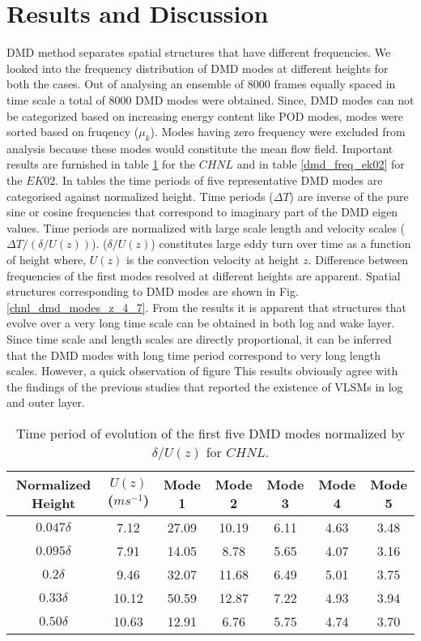 \documentclass{article}
\begin{document}
\section{Results and Discussion}
DMD method separates spatial structures that have different frequencies. We looked into the frequency distribution of DMD modes at different heights for both the cases. Out of analysing an ensemble of 8000 frames equally spaced in time scale a total of 8000 DMD modes were obtained. Since, DMD modes can not be categorized based on increasing energy content like POD modes, modes were sorted based on fruqency ($\mu_k$). Modes having zero frequency were excluded from analysis because these modes would constitute the mean flow field. Important results are furnished in table \ref{dmd_freq_chnl} for the $CHNL$ and in table \ref{dmd_freq_ek02} for the $EK02$. In tables the time periods of five representative DMD modes are categorised against normalized height. Time periods ($\Delta T$) are inverse of the pure sine or cosine frequencies that correspond to imaginary part of the DMD eigen values. Time periods are normalized with large scale length and velocity scales ($\Delta T / (\delta/U(z))$). ($\delta/U(z)$) constitutes large eddy turn over time as a function of height where, $U(z)$ is the convection velocity at height $z$. Difference between frequencies of the first modes resolved at different heights are apparent. Spatial structures corresponding to DMD modes are shown in Fig. \ref{chnl_dmd_modes_z_4_7}. From the results it is apparent that structures that evolve over a very long time scale can be obtained in both log and wake layer. Since time scale and length scales are directly proportional, it can be inferred that the DMD modes with long time period correspond to very long length scales. However, a quick observation of figure This results obviously agree with the findings of the previous studies that reported the existence of VLSMs in log and outer layer. 
\begin{table}[!bth]
\caption{Time period of evolution of the first five DMD modes normalized by $\delta / U(z)$ for $CHNL$. }
\begin{center}
\begin{tabular}{  c  c c c c c c  } 
\hline
Normalized Height & $U(z)$($ms^{-1}$) & Mode 1 & Mode 2 & Mode 3 & Mode 4 & Mode 5   \\
\hline
\multirow{1}{4em}{$0.047\delta$} & 7.12   & 27.09 & 10.19 & 6.11 & 4.63 & 3.48   \\
\hline
\multirow{1}{4em}{$0.095\delta$} &  7.91  & 14.05 & 8.78 & 5.65 & 4.07 & 3.16  \\
\hline
\multirow{1}{4em}{$0.2\delta$}   &  9.46  & 32.07 & 11.68 & 6.49 & 5.01 & 3.75  \\
\hline
\multirow{1}{4em}{$0.33\delta$}  &  10.12 & 50.59 & 12.87 & 7.22 & 4.93 & 3.94 \\
\hline 
\multirow{1}{4em}{$0.50\delta$}  &  10.63 & 12.91 & 6.76 & 5.75 & 4.74 & 3.70 \\
\hline
\hline
\end{tabular}
\end{center}
\label{dmd_freq_chnl}
\end{table}
\end{document}
